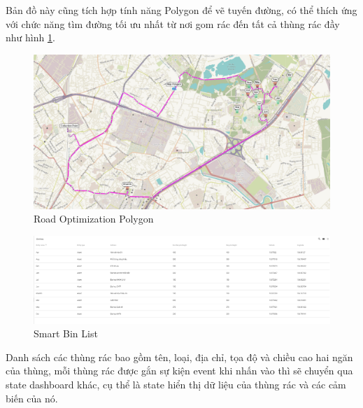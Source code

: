 Bản đồ này cũng tích hợp tính năng Polygon để vẽ tuyến đường, có thể thích ứng với chức năng tìm đường tối ưu nhất từ nơi gom rác đến tất cả thùng rác đầy như hình \ref{fig:map_optimization}.
\begin{figure}[H]
    \centering
    \includegraphics[width=\textwidth]{images/Khanh/Thingsboard/Road_optimization.PNG}
    \caption{Road Optimization Polygon}
    \label{fig:map_optimization}
\end{figure}


\begin{figure}[H]
    \centering
    \includegraphics[width=\textwidth]{images/Khanh/Thingsboard/Dashboard_list.PNG}
    \caption{Smart Bin List}
    \label{fig:dashboard_asset_list}
\end{figure}
Danh sách các thùng rác bao gồm tên, loại, địa chỉ, tọa độ và chiều cao hai ngăn của thùng, mỗi thùng rác được gắn sự kiện event khi nhấn vào thì sẽ chuyển qua state dashboard khác, cụ thể là state hiển thị dữ liệu của thùng rác và các cảm biến của nó.

